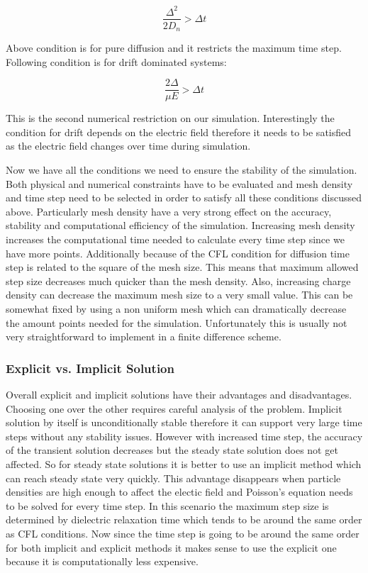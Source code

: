 \begin{equation}
\frac{\Delta ^2}{2 D_n}>\Delta t
\label{CFL_Diff}
\end{equation}

Above condition is for pure diffusion and it restricts the maximum time step. Following condition is for drift dominated systems:

\begin{equation}
\frac{2 \Delta }{\mu E}>\Delta t
\label{CFL_Drift}
\end{equation}

This is the second numerical restriction on our simulation. Interestingly the condition for drift depends on the electric field therefore it needs to be satisfied as the electric field changes over time during simulation.

Now we have all the conditions we need to ensure the stability of the simulation. Both physical and numerical constraints have to be evaluated and mesh density and time step need to be selected in order to satisfy all these conditions discussed above. Particularly mesh density have a very strong effect on the accuracy, stability and computational efficiency of the simulation. Increasing mesh density increases the computational time needed to calculate every time step since we have more points. Additionally because of the CFL condition for diffusion time step is related to the square of the mesh size. This means that maximum allowed step size decreases much quicker than the mesh density. Also, increasing charge density can decrease the maximum mesh size to a very small value. This can be somewhat fixed by using a non uniform mesh which can dramatically decrease the amount points needed for the simulation. Unfortunately this is usually not very straightforward to implement in a finite difference scheme. 

\subsubsection{Explicit vs. Implicit Solution}

Overall explicit and implicit solutions have their advantages and disadvantages. Choosing one over the other requires careful analysis of the problem. Implicit solution by itself is unconditionally stable therefore it can support very large time steps without any stability issues. However with increased time step, the accuracy of the transient solution decreases but the steady state solution does not get affected. So for steady state solutions it is better to use an implicit method which can reach steady state very quickly. This advantage disappears when particle densities are high enough to affect the electic field and Poisson's equation needs to be solved for every time step. In this scenario the maximum step size is determined by dielectric relaxation time which tends to be around the same order as CFL conditions. Now since the time step is going to be around the same order for both implicit and explicit methods it makes sense to use the explicit one because it is computationally less expensive.

